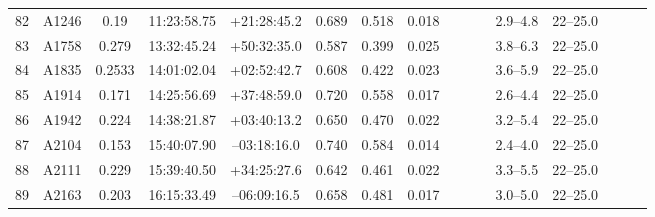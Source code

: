 \documentclass[useAMS,usenatbib]{mnras}
\begin{document}
\begin{table}
\begin{tabular*}{1.0\textwidth}{ l l c c c r c c c c c c c c c c }
82 & A1246 & 0.19 & 11:23:58.75 & +21:28:45.2 & 0.689 & 0.518 & 0.018 \hspace{8pt}& & & \hspace{8pt}& 2.9--4.8 \hspace{8pt}& 22--25.0 \\
83 & A1758 & 0.279 & 13:32:45.24 & +50:32:35.0 & 0.587 & 0.399 & 0.025 \hspace{8pt}& & & \hspace{8pt}& 3.8--6.3 \hspace{8pt}& 22--25.0 \\
84 & A1835 & 0.2533 & 14:01:02.04 & +02:52:42.7 & 0.608 & 0.422 & 0.023 \hspace{8pt}& & & \hspace{8pt}& 3.6--5.9 \hspace{8pt}& 22--25.0 \\
85 & A1914 & 0.171 & 14:25:56.69 & +37:48:59.0 & 0.720 & 0.558 & 0.017 \hspace{8pt}& & & \hspace{8pt}& 2.6--4.4 \hspace{8pt}& 22--25.0 \\
86 & A1942 & 0.224 & 14:38:21.87 & +03:40:13.2 & 0.650 & 0.470 & 0.022 \hspace{8pt}& & & \hspace{8pt}& 3.2--5.4 \hspace{8pt}& 22--25.0 \\
87 & A2104 & 0.153 & 15:40:07.90 & \hspace{1.5pt}--\hspace{0.5pt}03:18:16.0 & 0.740 & 0.584 & 0.014 \hspace{8pt}& & & \hspace{8pt}& 2.4--4.0 \hspace{8pt}& 22--25.0 \\
88 & A2111 & 0.229 & 15:39:40.50 & +34:25:27.6 & 0.642 & 0.461 & 0.022 \hspace{8pt}& & & \hspace{8pt}& 3.3--5.5 \hspace{8pt}& 22--25.0 \\
89 & A2163 & 0.203 & 16:15:33.49 & \hspace{1.5pt}--\hspace{0.5pt}06:09:16.5 & 0.658 & 0.481 & 0.017 \hspace{8pt}& & & \hspace{8pt}& 3.0--5.0 \hspace{8pt}& 22--25.0 \\

\end{tabular*}
\end{table}
\end{document}
